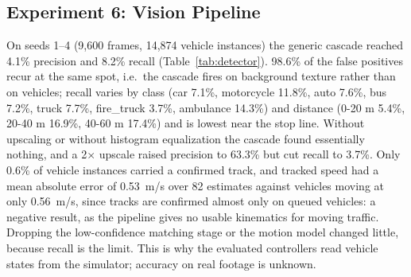 \subsection{Experiment 6: Vision Pipeline}
On seeds 1--4 (9,600 frames, 14,874 vehicle instances) the generic cascade reached 4.1\% precision and 8.2\% recall (Table~\ref{tab:detector}). 98.6\% of the false positives recur at the same spot, i.e.\ the cascade fires on background texture rather than on vehicles; recall varies by class (car 7.1\%, motorcycle 11.8\%, auto 7.6\%, bus 7.2\%, truck 7.7\%, fire\_truck 3.7\%, ambulance 14.3\%) and distance (0-20 m 5.4\%, 20-40 m 16.9\%, 40-60 m 17.4\%) and is lowest near the stop line. Without upscaling or without histogram equalization the cascade found essentially nothing, and a 2$\times$ upscale raised precision to 63.3\% but cut recall to 3.7\%. Only 0.6\% of vehicle instances carried a confirmed track, and tracked speed had a mean absolute error of 0.53~m/s over 82 estimates against vehicles moving at only 0.56~m/s, since tracks are confirmed almost only on queued vehicles: a negative result, as the pipeline gives no usable kinematics for moving traffic. Dropping the low-confidence matching stage or the motion model changed little, because recall is the limit. This is why the evaluated controllers read vehicle states from the simulator; accuracy on real footage is unknown.

\begin{table}[H]
\centering
\caption{Detector accuracy and ablation (synthetic frames)}
\label{tab:detector}
\small
{}
\par{}
\end{table}


